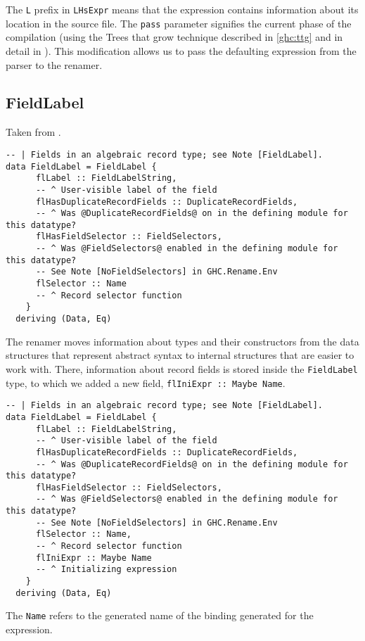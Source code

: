 \documentclass[en]{pracamgr}
\newcommand{\code}[1]{\lstinline[breaklines=true]{#1}}
\begin{document}
The \code{L} prefix in \code{LHsExpr} means that the expression contains information about its location in the source file.
The \code{pass} parameter signifies the current phase of the compilation (using the Trees that grow technique described in \ref{ghc:ttg} and in detail in \cite{Najd2017TreesTG}).
This modification allows us to pass the defaulting expression from the parser to the renamer.
\subsection*{FieldLabel}
Taken from \cite{GHCFieldLabelDef}.
\begin{lstlisting}
-- | Fields in an algebraic record type; see Note [FieldLabel].
data FieldLabel = FieldLabel {
      flLabel :: FieldLabelString,
      -- ^ User-visible label of the field
      flHasDuplicateRecordFields :: DuplicateRecordFields,
      -- ^ Was @DuplicateRecordFields@ on in the defining module for this datatype?
      flHasFieldSelector :: FieldSelectors,
      -- ^ Was @FieldSelectors@ enabled in the defining module for this datatype?
      -- See Note [NoFieldSelectors] in GHC.Rename.Env
      flSelector :: Name
      -- ^ Record selector function
    }
  deriving (Data, Eq)  
\end{lstlisting}

The renamer moves information about types and their constructors from the data structures that represent abstract syntax to internal structures that are easier to work with.
There, information about record fields is stored inside the \code{FieldLabel} type, to which we added a new field, \code{flIniExpr :: Maybe Name}.

\begin{lstlisting}
-- | Fields in an algebraic record type; see Note [FieldLabel].
data FieldLabel = FieldLabel {
      flLabel :: FieldLabelString,
      -- ^ User-visible label of the field
      flHasDuplicateRecordFields :: DuplicateRecordFields,
      -- ^ Was @DuplicateRecordFields@ on in the defining module for this datatype?
      flHasFieldSelector :: FieldSelectors,
      -- ^ Was @FieldSelectors@ enabled in the defining module for this datatype?
      -- See Note [NoFieldSelectors] in GHC.Rename.Env
      flSelector :: Name,
      -- ^ Record selector function
      flIniExpr :: Maybe Name
      -- ^ Initializing expression
    }
  deriving (Data, Eq)

\end{lstlisting}

The \code{Name} refers to the generated name of the binding generated for the expression.
\end{document}
